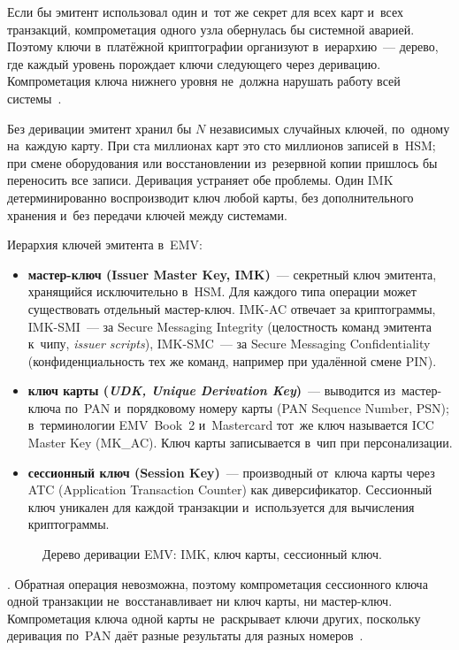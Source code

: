 Если бы эмитент использовал один и~тот же секрет для всех карт и~всех
транзакций, компрометация одного узла обернулась бы системной аварией. Поэтому
ключи в~платёжной криптографии организуют в~иерархию~--- дерево, где каждый
уровень порождает ключи следующего через деривацию. Компрометация ключа нижнего
уровня не~должна нарушать работу всей системы~\cite{nist-sp800-57}.

Без деривации эмитент хранил бы $N$ независимых случайных ключей, по~одному
на~каждую карту. При ста миллионах карт это сто миллионов записей в~HSM; при
смене оборудования или восстановлении из~резервной копии пришлось бы переносить
все записи. Деривация устраняет обе проблемы. Один IMK детерминированно
воспроизводит ключ любой карты, без дополнительного хранения и~без передачи
ключей между системами.

Иерархия ключей эмитента в~EMV:

\begin{itemize}
  \item \textbf{мастер-ключ (Issuer Master Key, IMK)}~--- секретный ключ
    эмитента, хранящийся исключительно в~HSM. Для каждого типа операции
    может существовать отдельный мастер-ключ. IMK-AC отвечает за
    криптограммы, IMK-SMI~--- за Secure Messaging Integrity (целостность
    команд эмитента к~чипу, \textit{issuer scripts}), IMK-SMC~--- за Secure
    Messaging Confidentiality (конфиденциальность тех же команд, например
    при удалённой смене PIN).
  \item \textbf{ключ карты (\textit{UDK, Unique Derivation Key})}~---
    выводится из~мастер-ключа по~PAN и~порядковому номеру карты (PAN
    Sequence Number, PSN); в~терминологии
    EMV~Book~2 и~Mastercard тот~же ключ называется ICC Master Key (MK\_AC).
    Ключ карты записывается в~чип при персонализации.
  \item \textbf{сессионный ключ (Session Key)}~--- производный от~ключа карты
    через ATC (Application Transaction Counter) как диверсификатор.
    Сессионный ключ уникален для каждой транзакции и~используется для
    вычисления криптограммы.
\end{itemize}

\begin{figure}[tbp]
  \centering
  \caption{Дерево деривации EMV: IMK, ключ карты, сессионный ключ.}\label{fig:crypto-key-hierarchy}
\end{figure}

. Обратная операция невозможна, поэтому компрометация сессионного
ключа одной транзакции не~восстанавливает ни ключ карты, ни мастер-ключ.
Компрометация ключа одной карты не~раскрывает ключи других,
поскольку деривация по~PAN даёт разные результаты для разных
номеров~\cite{emvco-book2}.

